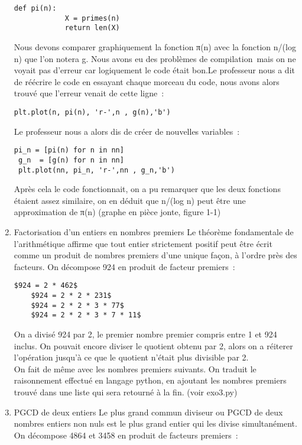 \documentclass{article}
\begin{document}
\begin{enumerate}
    \begin{lstlisting}[basicstyle=\small]
		def pi(n):
			X = primes(n)
			return len(X)
    \end{lstlisting}

		Nous devons comparer graphiquement la fonction π(n) avec la
		fonction n/(log n) que l’on notera g.
Nous avons eu des problèmes de compilation mais on ne voyait pas
d’erreur car logiquement le code était bon.Le professeur nous a dit
de réécrire le code en essayant chaque morceau du code, nous avons
 alors trouvé que l’erreur venait de cette ligne :
 \begin{lstlisting}[basicstyle=\small]
plt.plot(n, pi(n), 'r-',n , g(n),'b')
 \end{lstlisting}

 Le professeur nous a alors dis de créer de nouvelles variables : 
 \begin{lstlisting}[basicstyle=\small]
 pi_n = [pi(n) for n in nn]
 g_n  = [g(n) for n in nn]
 plt.plot(nn, pi_n, 'r-',nn , g_n,'b')
 \end{lstlisting}
 Après cela le code fonctionnait, on a pu remarquer que les deux fonctions
  étaient assez similaire, on en déduit que n/(log n) peut être une approximation de π(n)
(graphe en pièce jonte, figure 1-1) \\

	\item Factorisation d'un entiers en nombres premiers
	Le théorème fondamentale de l'arithmétique affirme que tout entier
	 strictement positif peut être écrit comme un produit de nombres premiers
	  d'une unique façon, à l'ordre près des facteurs.
On décompose 924 en produit de facteur premiers :
	\begin{lstlisting}[basicstyle=\small]
	$924 = 2 * 462$
	$924 = 2 * 2 * 231$
	$924 = 2 * 2 * 3 * 77$
	$924 = 2 * 2 * 3 * 7 * 11$
	\end{lstlisting}
	On a divisé 924 par 2, le premier nombre premier compris entre 1 et 924
	 inclus.
On pouvait encore diviser le quotient obtenu par 2, alors on a réiterer
l'opération jusqu'à ce que le quotient n'était plus divisible par 2. \\
On fait de même avec les nombres premiers suivants.
On traduit le raisonnement effectué en langage python, en ajoutant les nombres premiers trouvé dans une liste qui sera retourné à la fin.
 (voir exo3.py)


	\item PGCD de deux entiers
	Le plus grand commun diviseur ou PGCD de deux nombres entiers non nuls
	 est le plus grand entier qui les divise simultanément. \\
On décompose 4864 et 3458 en produit de facteurs premiers :
	\begin{lstlisting}[basicstyle=\small]


\end{lstlisting}
\end{enumerate}
\end{document}
